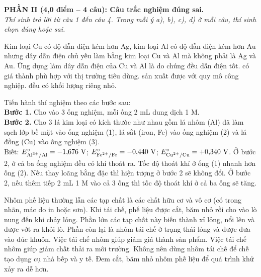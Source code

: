 \documentclass[11pt,a4paper]{article}
\def\loigiai#1{}
\begin{document}
\newpage

\noindent
\textbf{PHẦN II (4,0 điểm -- 4 câu): Câu trắc nghiệm đúng sai.}\\
\textit{Thí sinh trả lời từ câu 1 đến câu 4. Trong mỗi ý a), b), c), d) ở mỗi câu, thí sinh chọn đúng hoặc sai.}

\setcounter{ex}{0}

\begin{ex}
Kim loại Cu có độ dẫn điện kém hơn Ag, kim loại Al có độ dẫn điện kém hơn Au nhưng dây dẫn điện chủ yếu làm bằng kim loại Cu và Al mà không phải là Ag và Au. Ứng dụng làm dây dẫn điện của Cu và Al là do chúng
\choiceTF
{đều dẫn điện tốt.}
{có giá thành phù hợp với thị trường tiêu dùng.}
{sản xuất được với quy mô công nghiệp.}
{đều có khối lượng riêng nhỏ.}
\loigiai{}
\end{ex}

\begin{ex}
Tiến hành thí nghiệm theo các bước sau:\\
\textbf{Bước 1.} Cho vào 3 ống nghiệm, mỗi ống 2 mL dung dịch  1 M.\\
\textbf{Bước 2.} Cho 3 lá kim loại có kích thước như nhau gồm lá nhôm (Al) đã làm sạch lớp bề mặt vào ống nghiệm (1), lá sắt (iron, Fe) vào ống nghiệm (2) và lá đồng (Cu) vào ống nghiệm (3).\\
Biết: $E^\circ_{\ce{Al^3+/Al}} = -1{,}676\text{ V}$; $E^\circ_{\ce{Fe^2+/Fe}} = -0{,}440\text{ V}$; $E^\circ_{\ce{Cu^2+/Cu}} = +0{,}340\text{ V}$.
\choiceTF
{Ở bước 2, ở cả ba ống nghiệm đều có khí thoát ra.}
{Tốc độ thoát khí ở ống (1) nhanh hơn ống (2).}
{Nếu thay  loãng bằng  đặc thì hiện tượng ở bước 2 sẽ không đổi.}
{Ở bước 2, nếu thêm tiếp 2 mL  1 M vào cả 3 ống thì tốc độ thoát khí ở cả ba ống sẽ tăng.}
\loigiai{}
\end{ex}

\begin{ex}
Nhôm phế liệu thường lẫn các tạp chất là các chất hữu cơ và vô cơ (có trong nhãn, mác do in hoặc sơn). Khi tái chế, phế liệu được cắt, băm nhỏ rồi cho vào lò nung đến khi chảy lỏng. Phần lớn các tạp chất này biến thành xỉ lỏng, nổi lên và được vớt ra khỏi lò. Phần còn lại là nhôm tái chế ở trạng thái lỏng và được đưa vào đúc khuôn.
\choiceTF
{Việc tái chế nhôm giúp giảm giá thành sản phẩm.}
{Việc tái chế nhôm giúp giảm chất thải ra môi trường.}
{Không nên dùng nhôm tái chế để chế tạo dụng cụ nhà bếp và y tế.}
{Đem cắt, băm nhỏ nhôm phế liệu để quá trình khử  xảy ra dễ hơn.}
\loigiai{}
\end{ex}
\end{document}

